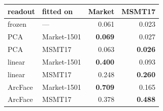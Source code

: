 \begin{tabular}{llrr}
\toprule
readout & fitted on & Market & MSMT17 \\
\midrule
frozen & --- & 0.061 & 0.023 \\
\midrule
PCA & Market-1501 & \textbf{0.069} & 0.027 \\
PCA & MSMT17 & 0.063 & \textbf{0.026} \\
\midrule
linear & Market-1501 & \textbf{0.400} & 0.093 \\
linear & MSMT17 & 0.248 & \textbf{0.260} \\
\midrule
ArcFace & Market-1501 & \textbf{0.709} & 0.165 \\
ArcFace & MSMT17 & 0.378 & \textbf{0.488} \\
\bottomrule
\end{tabular}
